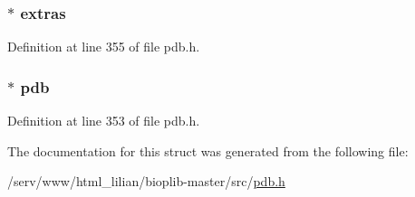 \hypertarget{struct_p_d_b_s_t_r_u_c_t_aaa357dbbf4b88fcb1df71547b2d085a6}{
\subsubsection[{extras}]{$\ast$ extras}}\label{struct_p_d_b_s_t_r_u_c_t_aaa357dbbf4b88fcb1df71547b2d085a6}


Definition at line 355 of file pdb.\-h.

\hypertarget{struct_p_d_b_s_t_r_u_c_t_a9cac171f884f9ad8fd8dbb4d36b233a0}{
\subsubsection[{pdb}]{$\ast$ pdb}}\label{struct_p_d_b_s_t_r_u_c_t_a9cac171f884f9ad8fd8dbb4d36b233a0}


Definition at line 353 of file pdb.\-h.



The documentation for this struct was generated from the following file\-:\begin{DoxyCompactItemize}
\item 
/serv/www/html\-\_\-lilian/bioplib-\/master/src/\hyperlink{pdb_8h}{pdb.\-h}\end{DoxyCompactItemize}
